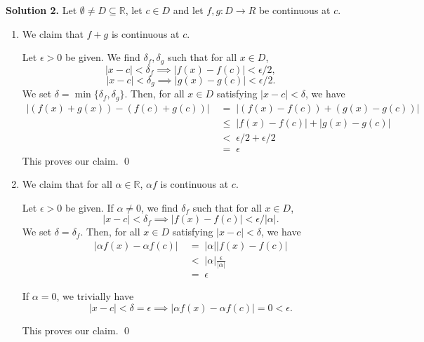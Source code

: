 \documentclass[10pt]{article}
\begin{document}
        \textbf{Solution 2.}
        Let $\emptyset \neq D \subseteq \mathbb{R}$, let $c \in D$ and let $f, g\colon D \to R$ be continuous at $c$.
        \begin{enumerate}
                \item We claim that $f + g$ is continuous at $c$.

                Let $\epsilon > 0$ be given.
                We find $\delta_f, \delta_g$ such that for all $x \in D$,
                \[|x - c| < \delta_f \implies |f(x) - f(c)| < \epsilon/2,\]
                \[|x - c| < \delta_g \implies |g(x) - g(c)| < \epsilon/2.\]
                We set $\delta = \min\{\delta_f, \delta_g\}$. Then, for all $x \in D$ satisfying
                $|x - c| < \delta$, we have
                \begin{align*}
                |(f(x) + g(x)) - (f(c) + g(c))| \;&=\; |(f(x) - f(c)) + (g(x) - g(c))| \\
                        \;&\le\; |f(x) - f(c)| + |g(x) - g(c)| \\
                        \;&<\; \epsilon/2 + \epsilon/2 \\
                        \;&=\; \epsilon
                \end{align*}
                This proves our claim. \qed

                \item We claim that for all $\alpha \in \mathbb{R}$, $\alpha f$ is continuous at $c$.

                Let $\epsilon > 0$ be given.
                If $\alpha \neq 0$, we find $\delta_f$ such that for all $x \in D$,
                \[|x - c| < \delta_f \implies |f(x) - f(c)| < \epsilon/|\alpha|.\]
                We set $\delta = \delta_f$. Then, for all $x \in D$ satisfying
                $|x - c| < \delta$, we have
                \begin{align*}
                |\alpha f(x) - \alpha f(c)| \;&=\; |\alpha| |f(x) - f(c)| \\
                        \;&<\; |\alpha| \frac{\epsilon}{|\alpha|} \\
                        \;&=\; \epsilon
                \end{align*}

                If $\alpha = 0$, we trivially have
                \[|x - c| < \delta = \epsilon \implies |\alpha f(x) - \alpha f(c)| = 0 < \epsilon.\]

                This proves our claim. \qed


\end{enumerate}
\end{document}
